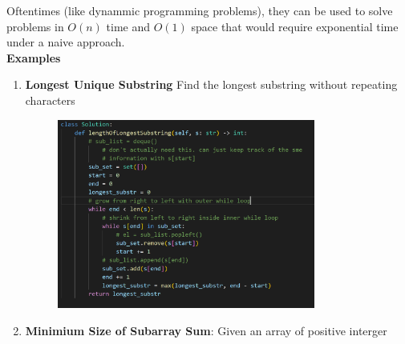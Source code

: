 \documentclass[12pt]{article}
\begin{document}
Oftentimes (like dynammic programming problems), they can be used to solve problems in \(O(n)\) time and \(O(1)\) space that would require exponential time under a naive approach. \\

\textbf{Examples}
\begin{enumerate}
\item \textbf{Longest Unique Substring} Find the longest substring without repeating characters

\begin{figure}[H]
    \centering
    \includegraphics[width=0.8\textwidth]{./slidingwindow.png} %
\end{figure}
\item \textbf{Minimium Size of Subarray Sum}: Given an array of positive interger
\end{enumerate}
\end{document}
